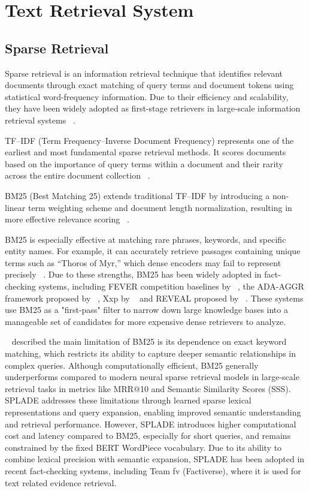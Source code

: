 \section{Text Retrieval System}

\subsection{Sparse Retrieval}

Sparse retrieval is an information retrieval technique that identifies relevant documents through exact matching of query terms and document tokens using statistical word-frequency information. Due to their efficiency and scalability, they have been widely adopted as first-stage retrievers in large-scale information retrieval systems ~\cite{Wang2022Aug}.

TF–IDF (Term Frequency–Inverse Document Frequency) represents one of the earliest and most fundamental sparse retrieval methods. It scores documents based on the importance of query terms within a document and their rarity across the entire document collection ~\cite{Wang2024Jul}.

BM25 (Best Matching 25) extends traditional TF–IDF by introducing a non-linear term weighting scheme and document length normalization, resulting in more effective relevance scoring ~\cite{Robertson2009Sep}. 

BM25 is especially effective at matching rare phrases, keywords, and specific entity names. For example, it can accurately retrieve passages containing unique terms such as “Thoros of Myr,” which dense encoders may fail to represent precisely ~\cite{Karpukhin2020Nov}. Due to these strengths, BM25 has been widely adopted in fact-checking systems, including FEVER competition baselines by ~\citet{Cao2025May}, the ADA-AGGR framework proposed by ~\citet{Upravitelev2026Mar}, Xxp by ~\citet{Tsoneva2026Mar} and REVEAL proposed by ~\citet{Tariq2026Mar}. These systems use BM25 as a "first-pass" filter to narrow down large knowledge bases into a manageable set of candidates for more expensive dense retrievers to analyze.

~\citet{Won2025Nov} described the main limitation of BM25 is its dependence on exact keyword matching, which restricts its ability to capture deeper semantic relationships in complex queries. Although computationally efficient, BM25 generally underperforms compared to modern neural sparse retrieval models in large-scale retrieval tasks in metrics like MRR@10 and Semantic Similarity Scores (SSS). SPLADE addresses these limitations through learned sparse lexical representations and query expansion, enabling improved semantic understanding and retrieval performance. However, SPLADE introduces higher computational cost and latency compared to BM25, especially for short queries, and remains constrained by the fixed BERT WordPiece vocabulary. Due to its ability to combine lexical precision with semantic expansion, SPLADE has been adopted in recent fact-checking systems, including Team fv (Factiverse), where it is used for text related evidence retrieval.

